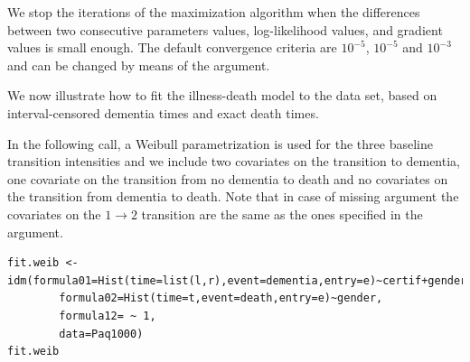 \documentclass[article]{jss}
\begin{document}
We stop the iterations of the maximization algorithm when the differences 
between two consecutive
parameters values, log-likelihood values, and gradient values is small
enough.  The default convergence criteria are \(10^{-5}\), \(10^{-5}\) and
\(10^{-3}\) and can be changed by means of the  argument.

We now illustrate how to fit the illness-death model to the 
 data set, based on 
interval-censored dementia times and exact death times.

\bigskip

In the following call, a Weibull parametrization is used for the three baseline 
transition intensities and we include two covariates on the transition to dementia,
one covariate on the transition from no dementia to death and no covariates 
on the transition from dementia to death. Note that in case of missing 
argument the covariates on the \(1 \rightarrow 2\) transition are the same as 
the ones specified in the   argument.

\lstset{language=R,label= ,caption= ,numbers=none}
\begin{lstlisting}
fit.weib <- idm(formula01=Hist(time=list(l,r),event=dementia,entry=e)~certif+gender,
		formula02=Hist(time=t,event=death,entry=e)~gender,
		formula12= ~ 1,
		data=Paq1000)
fit.weib
\end{lstlisting}
\end{document}
